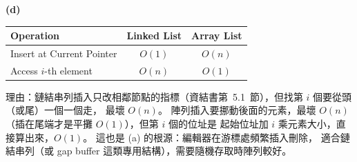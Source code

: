 \begin{pastsoln}
\textbf{(d)}
\begin{center}
\begin{tabular}{|l|c|c|}
\hline
Operation & Linked List & Array List \\ \hline
Insert at Current Pointer & $O(1)$ & $O(n)$ \\ \hline
Access $i$-th element & $O(n)$ & $O(1)$ \\ \hline
\end{tabular}
\end{center}
理由：鏈結串列插入只改相鄰節點的指標（資結書第~5.1~節），但找第 $i$ 個要從頭（或尾）一個一個走，
最壞 $O(n)$。 陣列插入要挪動後面的元素，最壞 $O(n)$（插在尾端才是平攤 $O(1)$），但第 $i$ 個的位址是
起始位址加 $i$ 乘元素大小，直接算出來，$O(1)$。 這也是 (a) 的根源：編輯器在游標處頻繁插入刪除，
適合鏈結串列（或 gap buffer 這類專用結構），需要隨機存取時陣列較好。
\end{pastsoln}
